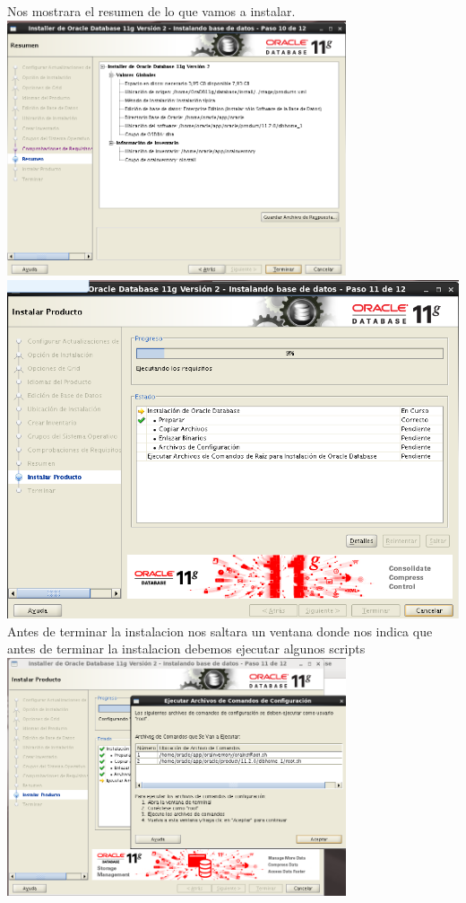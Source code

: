 \documentclass[12pt,letterpaper]{article}
\begin{document}
\begin{center}
Nos mostrara el resumen de lo que vamos a instalar.\\
\includegraphics[width=10cm]{./oraclelinux/23.png}\\
\includegraphics[width=15cm]{./oraclelinux/24.png}\\
Antes de terminar la instalacion nos saltara un ventana donde nos indica que antes de terminar la instalacion debemos ejecutar algunos scripts\\
\includegraphics[width=10cm]{./oraclelinux/25.png}\\

\end{center}
\end{document}
